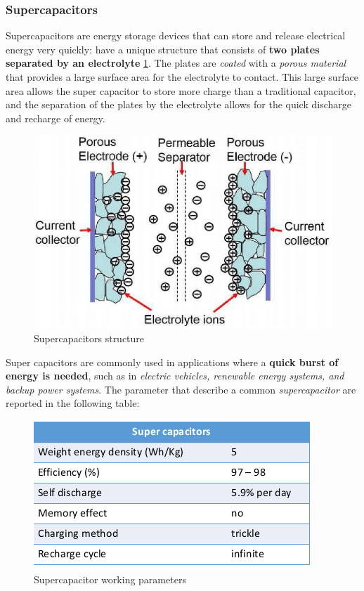 \documentclass[10pt,a4paper]{report}
\theoremstyle{definition}
\begin{document}
\subsubsection{Supercapacitors}\label{sec:supercapacitors}
Supercapacitors are energy storage devices that can store and release electrical energy very quickly: have a unique structure that consists of \textbf{two plates separated by an electrolyte} \ref{supercapacitors}. The plates are \textit{coated} with a \textit{porous material} that provides a large surface area for the electrolyte to contact. This large surface area allows the super capacitor to store more charge than a traditional capacitor, and the separation of the plates by the electrolyte allows for the quick discharge and recharge of energy.
\begin{figure}[h]
	\centering\includegraphics[scale=0.35]{images/Pasted image 20230508170934.png}
	\caption{Supercapacitors structure}
	\label{supercapacitors}
\end{figure}

Super capacitors are commonly used in applications where a \textbf{quick burst of energy is needed}, such as in \textit{electric vehicles, renewable energy systems, and backup power systems}. The parameter that describe a common \textit{supercapacitor} are reported in the following table:
\begin{figure}[h]
	\centering\includegraphics[scale=0.60]{images/Pasted image 20230506085540.png}
	\caption{Supercapacitor working parameters}
\end{figure}
\end{document}
